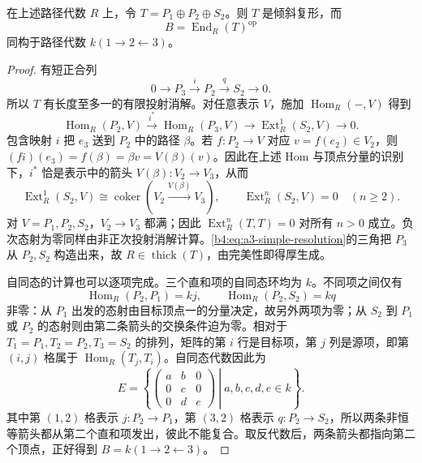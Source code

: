 \begin{example}\label{b4:exm:a3-tilting-object}
	在上述路径代数 \(R\) 上，令 \(T=P_1\oplus P_2\oplus S_2\)。则 \(T\) 是倾斜复形，而
	\[
		B=\operatorname{End}_R(T)^{\mathrm{op}}
	\]
	同构于路径代数 \(k(1\to2\leftarrow3)\)。
\end{example}
\begin{proof}
	有短正合列
	\begin{equation}\label{b4:eq:a3-simple-resolution}
		0\longrightarrow P_3\xrightarrow{i}P_2 \xrightarrow{q}S_2\longrightarrow0.
	\end{equation}
	所以 \(T\) 有长度至多一的有限投射消解。对任意表示 \(V\)，施加 \(\operatorname{Hom}_R(-,V)\) 得到
	\[
		\operatorname{Hom}_R(P_2,V)\xrightarrow{i^*} \operatorname{Hom}_R(P_3,V)\longrightarrow \operatorname{Ext}^1_R(S_2,V)\longrightarrow0.
	\]
	包含映射 \(i\) 把 \(e_3\) 送到 \(P_2\) 中的路径 \(\beta\)。若 \(f:P_2\to V\) 对应 \(v=f(e_2)\in V_2\)，则 \((fi)(e_3)=f(\beta)=\beta v=V(\beta)(v)\)。因此在上述 Hom 与顶点分量的识别下，\(i^*\) 恰是表示中的箭头 \(V(\beta):V_2\to V_3\)，从而
	\[
		\operatorname{Ext}^1_R(S_2,V) \cong\operatorname{coker}(V_2\xrightarrow{V(\beta)} V_3), \qquad \operatorname{Ext}^{n}_R(S_2,V)=0\quad(n\ge2).
	\]
	对 \(V=P_1,P_2,S_2\)，\(V_2\to V_3\) 都满；因此 \(\operatorname{Ext}^n_R(T,T)=0\) 对所有 \(n>0\) 成立。负次态射为零同样由非正次投射消解计算。\eqref{b4:eq:a3-simple-resolution}的三角把 \(P_3\) 从 \(P_2,S_2\) 构造出来，故 \(R\in\operatorname{thick}(T)\)，由完美性即得厚生成。

	自同态的计算也可以逐项完成。三个直和项的自同态环均为 \(k\)。不同项之间仅有
	\[
		\operatorname{Hom}_R(P_2,P_1)=k j, \qquad \operatorname{Hom}_R(P_2,S_2)=k q
	\]
	非零：从 \(P_1\) 出发的态射由目标顶点一的分量决定，故另外两项为零；从 \(S_2\) 到 \(P_1\) 或 \(P_2\) 的态射则由第二条箭头的交换条件迫为零。相对于 \(T_1=P_1,T_2=P_2,T_3=S_2\) 的排列，矩阵的第 \(i\) 行是目标项，第 \(j\) 列是源项，即第 \((i,j)\) 格属于 \(\operatorname{Hom}_R(T_j,T_i)\)。自同态代数因此为
	\[
		E=\left\{\left.
		\begin{pmatrix}a&b&0\\0&c&0\\0&d&e\end{pmatrix}
		\ \right|\ a,b,c,d,e\in k\right\}.
	\]
	其中第 \((1,2)\) 格表示 \(j:P_2\to P_1\)，第 \((3,2)\) 格表示 \(q:P_2\to S_2\)，所以两条非恒等箭头都从第二个直和项发出，彼此不能复合。取反代数后，两条箭头都指向第二个顶点，正好得到 \(B=k(1\to2\leftarrow3)\)。
\end{proof}

